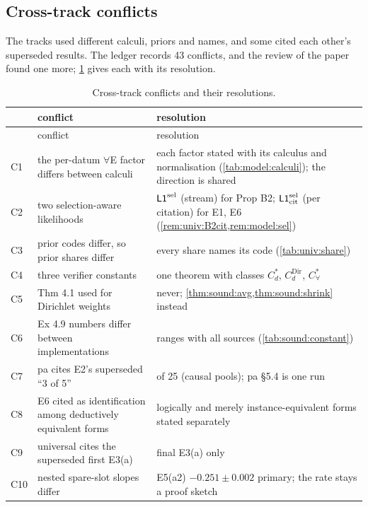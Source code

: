 \subsection{Cross-track conflicts}\label{app:ver:conflicts}

The tracks used different calculi, priors and names, and some cited each other's superseded results. The ledger records 43 conflicts, and the review of the paper found one more; \cref{tab:ver:conflicts} gives each with its resolution.

{\footnotesize
\begin{longtable}{@{}l>{\raggedright\arraybackslash}p{6.0cm}>{\raggedright\arraybackslash}p{7.7cm}@{}}
\caption{Cross-track conflicts and their resolutions.}\label{tab:ver:conflicts}\\
\toprule
& conflict & resolution\\
\midrule
\endfirsthead
\toprule
& conflict & resolution\\
\midrule
\endhead
\bottomrule
\endfoot
C1 & the per-datum $\forall$E factor differs between calculi & each factor stated with its calculus and normalisation (\cref{tab:model:calculi}); the direction is shared\\
C2 & two selection-aware likelihoods & $\mathord{\mathsf{L1}}^{\mathrm{sel}}$ (stream) for Prop B2; $\mathord{\mathsf{L1}}^{\mathrm{sel}}_{\mathrm{cit}}$ (per citation) for E1, E6 (\cref{rem:univ:B2cit,rem:model:sel})\\
C3 & prior codes differ, so prior shares differ & every share names its code (\cref{tab:univ:share})\\
C4 & three verifier constants & one theorem with classes $C^*_d$, $C^{\mathrm{Dir}}_d$, $C^*_\forall$\\
C5 & Thm 4.1 used for Dirichlet weights & never; \cref{thm:sound:avg,thm:sound:shrink} instead\\
C6 & Ex 4.9 numbers differ between implementations & ranges with all sources (\cref{tab:sound:constant})\\
C7 & pa cites E2's superseded ``3 of 5'' & 5 of 25 (causal pools); pa \S5.4 is one run\\
C8 & E6 cited as identification among deductively equivalent forms & logically and merely instance-equivalent forms stated separately\\
C9 & universal cites the superseded first E3(a) & final E3(a) only\\
C10 & nested spare-slot slopes differ & E5(a2) $-0.251\pm0.002$ primary; the rate stays a proof sketch\\

\end{longtable}}
